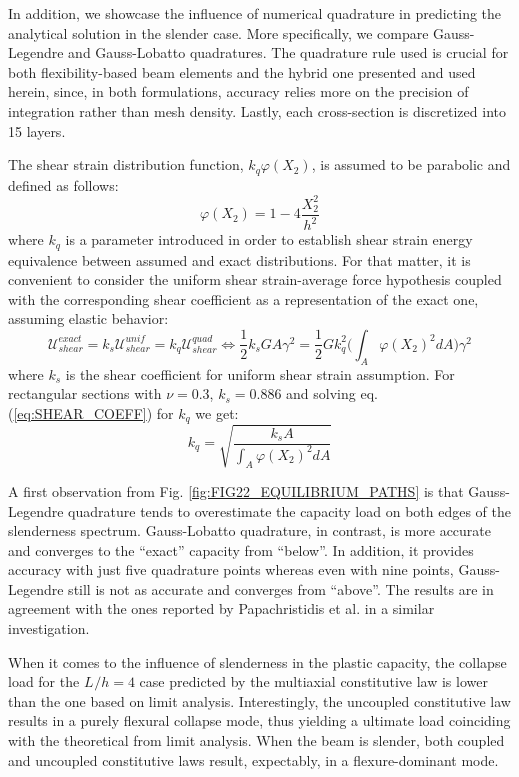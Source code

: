  In addition, we showcase the 
influence of numerical quadrature in predicting the analytical solution in the 
slender case. More specifically, we compare Gauss-Legendre and Gauss-Lobatto 
quadratures. The quadrature rule used is crucial for both flexibility-based 
beam elements and the hybrid one presented and used herein, since, in both 
formulations, accuracy relies more on the precision of integration rather than 
mesh density. Lastly, each cross-section is discretized into 15 layers.

The shear strain distribution function, $k_q\varphi(X_2)$, is assumed to be 
parabolic and defined as follows:
\begin{equation}
	\varphi(X_2) = 1-4\frac{X_2^2}{h^2}
	\label{eq:SHEAR_DISTR_FUN}
\end{equation}
\noindent where $k_q$ is a parameter introduced in order to establish shear 
strain energy equivalence between assumed and exact distributions. For that 
matter, it is convenient to consider the uniform shear strain-average force 
hypothesis coupled with the corresponding shear coefficient as a representation 
of the exact one, assuming elastic behavior:
\begin{equation}
	\mathcal{U}_{shear}^{exact}=k_s\mathcal{U}_{shear}^{unif} = 
	k_q\mathcal{U}_{shear}^{quad}\Longleftrightarrow 
	\frac{1}{2}k_sGA\gamma ^2=\frac{1}{2}G k_q^2\bigg(\int_A \varphi(X_2)^2 dA 
	\bigg) \gamma ^2
	\label{eq:SHEAR_COEFF}
\end{equation}
\noindent where $k_s$ is the shear coefficient for uniform shear strain 
assumption. For rectangular sections with $\nu=0.3$, 
$k_s=0.886$ and solving eq. (\ref{eq:SHEAR_COEFF}) for $k_q$ we 
get:
\begin{equation}
	k_q = \sqrt{\frac{k_s A}{\int_A \varphi(X_2)^2 dA}}
	\label{eq:QUAD_COEFF}
\end{equation}

A first observation from Fig. \ref{fig:FIG22_EQUILIBRIUM_PATHS} is that 
Gauss-Legendre quadrature tends to overestimate the capacity load on both edges 
of the slenderness spectrum. Gauss-Lobatto quadrature, in contrast, is 
more accurate and converges to the ``exact'' capacity from ``below''. In 
addition, it provides accuracy with just five quadrature points whereas even 
with nine points, Gauss-Legendre still is not as accurate and converges from 
``above''. 
The results are in agreement with the ones reported by Papachristidis et 
al.\cite{Papachristidis2010} in a similar investigation.

When it comes to the influence of slenderness in the plastic capacity, the 
collapse 
load for the $L^{}/h=4$ case predicted by the multiaxial constitutive law is 
lower than the one based on limit analysis. Interestingly, the uncoupled 
constitutive law results in a purely flexural collapse mode, thus yielding a 
ultimate load coinciding with the theoretical from limit analysis. When the 
beam is slender, both coupled and uncoupled constitutive laws result, 
expectably, in a flexure-dominant mode. 

